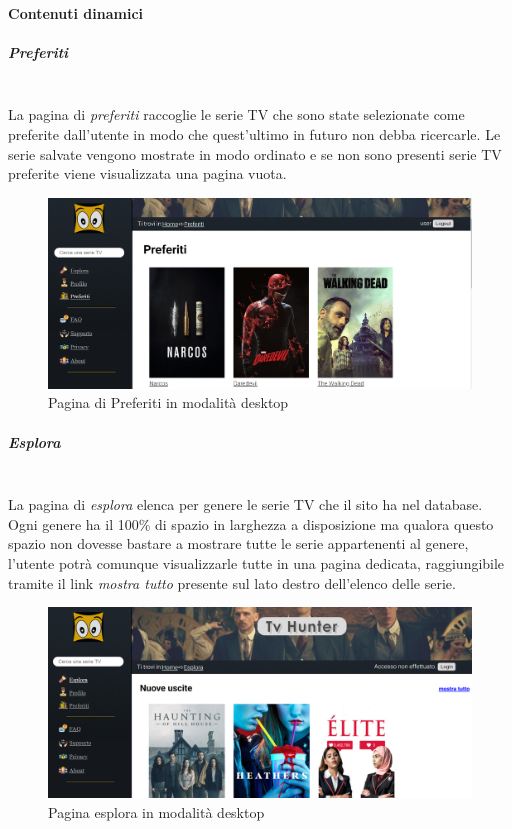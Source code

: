 \paragraph{Contenuti dinamici}   

\subparagraph{Preferiti}
~\\	
La pagina di \textit{preferiti} raccoglie le serie TV che sono state selezionate come preferite dall'utente in modo che quest'ultimo in futuro non debba ricercarle. Le serie salvate vengono mostrate in modo ordinato e se non sono presenti serie TV preferite viene visualizzata una pagina vuota. 
\begin{figure}[H]
	\centerline{\includegraphics[scale=0.33]{img/preferiti.png}}
	\caption{Pagina di Preferiti in modalità desktop}
	\label{fig:addForm}
\end{figure}	


\subparagraph{Esplora}
~\\	
La pagina di \textit{esplora} elenca per genere le serie TV che il sito ha nel database. Ogni genere ha il 100\% di spazio in larghezza a disposizione ma qualora questo spazio non dovesse bastare a mostrare tutte le serie appartenenti al genere, l'utente potrà comunque visualizzarle tutte in una pagina dedicata, raggiungibile tramite il link \textit{mostra tutto} presente sul lato destro dell'elenco delle serie.
\begin{figure}[H]
	\centerline{\includegraphics[scale=0.33]{img/esplora.png}}
	\caption{Pagina esplora in modalità desktop}
	\label{fig:addForm}
\end{figure}	

